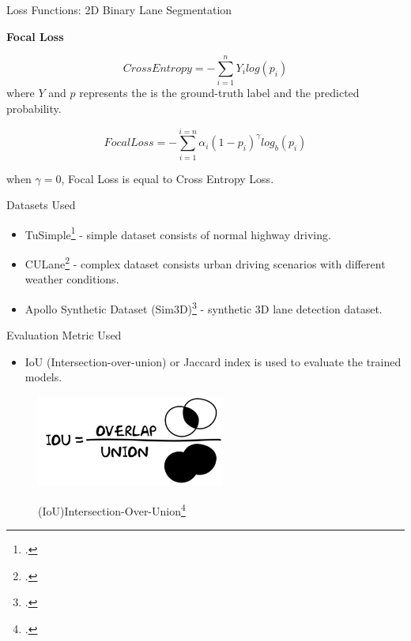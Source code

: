 \documentclass[aspectratio=169]{beamer}
\begin{document}
\begin{frame}{Loss Functions: 2D Binary Lane Segmentation}

\textbf{Focal Loss}

\begin{equation}
            Cross Entropy = - \sum^{n}_{i=1}Y_{i}log(p_{i})
        \end{equation}
        where $Y$ and $p$ represents the is the ground-truth label and the predicted probability.
        
        \begin{equation}
            Focal Loss = - \sum^{i=n}_{i=1} \alpha_{i}(1-p_{i})^{\gamma} log_{b}(p_{i})
        \end{equation}
        
         when $\gamma = 0$, Focal Loss is equal to Cross Entropy Loss.
\end{frame}

\begin{frame}{Datasets Used}
    \begin{itemize}
        \item TuSimple\footcite{Tusimple} - simple dataset consists of normal highway driving.
        \item CULane\footcite{pan2018SCNN} - complex dataset consists urban driving scenarios with different weather conditions.
        \item Apollo Synthetic Dataset (Sim3D)\footcite{guo2020gen} - synthetic 3D lane detection dataset.
    \end{itemize}
\end{frame}

\begin{frame}{Evaluation Metric Used}
    
    \begin{itemize}
        \item IoU (Intersection-over-union) or Jaccard index is used to evaluate the trained models.
    \end{itemize}
    \begin{figure}[H]
     \centering
     
\includegraphics[width=0.5\linewidth, height=3cm]{images/IOU.png} 
\label{fig:subim1}

\caption{ (IoU)Intersection-Over-Union\footcite{IOU}}
\label{fig:image2}
\end{figure}
\end{frame}
\end{document}
